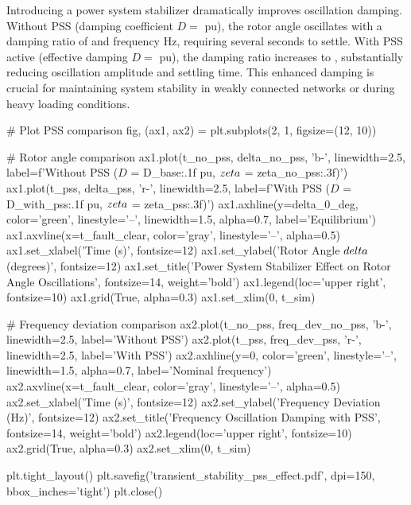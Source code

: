 \documentclass[11pt,a4paper]{article}
\begin{document}
Introducing a power system stabilizer dramatically improves oscillation damping. Without PSS (damping coefficient $D = $  pu), the rotor angle oscillates with a damping ratio of  and frequency  Hz, requiring several seconds to settle. With PSS active (effective damping $D = $  pu), the damping ratio increases to , substantially reducing oscillation amplitude and settling time. This enhanced damping is crucial for maintaining system stability in weakly connected networks or during heavy loading conditions.

\begin{pycode}
# Plot PSS comparison
fig, (ax1, ax2) = plt.subplots(2, 1, figsize=(12, 10))

# Rotor angle comparison
ax1.plot(t_no_pss, delta_no_pss, 'b-', linewidth=2.5, label=f'Without PSS ($D$ = {D_base:.1f} pu, $\\zeta$ = {zeta_no_pss:.3f})')
ax1.plot(t_pss, delta_pss, 'r-', linewidth=2.5, label=f'With PSS ($D$ = {D_with_pss:.1f} pu, $\\zeta$ = {zeta_pss:.3f})')
ax1.axhline(y=delta_0_deg, color='green', linestyle='--', linewidth=1.5, alpha=0.7, label='Equilibrium')
ax1.axvline(x=t_fault_clear, color='gray', linestyle='--', alpha=0.5)
ax1.set_xlabel('Time (s)', fontsize=12)
ax1.set_ylabel('Rotor Angle $\\delta$ (degrees)', fontsize=12)
ax1.set_title('Power System Stabilizer Effect on Rotor Angle Oscillations', fontsize=14, weight='bold')
ax1.legend(loc='upper right', fontsize=10)
ax1.grid(True, alpha=0.3)
ax1.set_xlim(0, t_sim)

# Frequency deviation comparison
ax2.plot(t_no_pss, freq_dev_no_pss, 'b-', linewidth=2.5, label='Without PSS')
ax2.plot(t_pss, freq_dev_pss, 'r-', linewidth=2.5, label='With PSS')
ax2.axhline(y=0, color='green', linestyle='--', linewidth=1.5, alpha=0.7, label='Nominal frequency')
ax2.axvline(x=t_fault_clear, color='gray', linestyle='--', alpha=0.5)
ax2.set_xlabel('Time (s)', fontsize=12)
ax2.set_ylabel('Frequency Deviation (Hz)', fontsize=12)
ax2.set_title('Frequency Oscillation Damping with PSS', fontsize=14, weight='bold')
ax2.legend(loc='upper right', fontsize=10)
ax2.grid(True, alpha=0.3)
ax2.set_xlim(0, t_sim)

plt.tight_layout()
plt.savefig('transient_stability_pss_effect.pdf', dpi=150, bbox_inches='tight')
plt.close()
\end{pycode}
\end{document}
